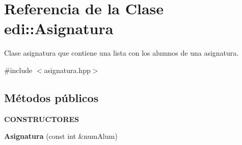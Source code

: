 \hypertarget{classedi_1_1Asignatura}{\section{Referencia de la Clase edi\+:\+:Asignatura}
\label{classedi_1_1Asignatura}
}


Clase asignatura que contiene una lista con los alumnos de una asignatura.  




{\ttfamily \#include $<$asignatura.\+hpp$>$}

\subsection*{Métodos públicos}
\begin{Indent}{\bf C\+O\+N\+S\+T\+R\+U\+C\+T\+O\+R\+E\+S}\par
\begin{DoxyCompactItemize}
\item 
\hypertarget{classedi_1_1Asignatura_a75a3265f1ad2a0ddb916e5921ab64076}{{\bfseries Asignatura} (const int \&num\+Alum)}\label{classedi_1_1Asignatura_a75a3265f1ad2a0ddb916e5921ab64076}

\end{DoxyCompactItemize}
\end{Indent}
